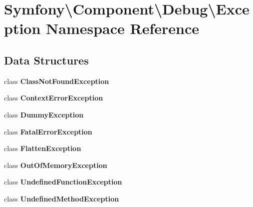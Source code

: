 \section{Symfony\textbackslash{}Component\textbackslash{}Debug\textbackslash{}Exception Namespace Reference}
\label{namespace_symfony_1_1_component_1_1_debug_1_1_exception}
\subsection*{Data Structures}
\begin{DoxyCompactItemize}
\item 
class {\bf Class\+Not\+Found\+Exception}
\item 
class {\bf Context\+Error\+Exception}
\item 
class {\bf Dummy\+Exception}
\item 
class {\bf Fatal\+Error\+Exception}
\item 
class {\bf Flatten\+Exception}
\item 
class {\bf Out\+Of\+Memory\+Exception}
\item 
class {\bf Undefined\+Function\+Exception}
\item 
class {\bf Undefined\+Method\+Exception}
\end{DoxyCompactItemize}
